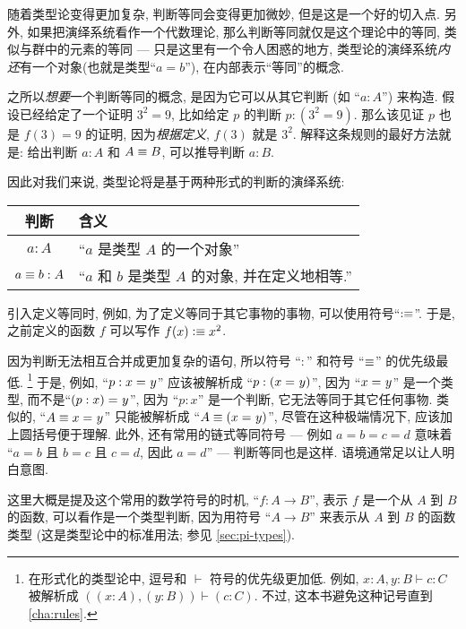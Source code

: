 随着类型论变得更加复杂, 判断等同会变得更加微妙, 但是这是一个好的切入点.
另外, 如果把演绎系统看作一个代数理论, 那么判断等同就仅是这个理论中的等同, 类似与群中的元素的等同 ---
只是这里有一个令人困惑的地方, 类型论的演绎系统\emph{内}\emph{还}有一个对象(也就是类型``$a=b$''), 在内部表示``等同''的概念.

之所以\emph{想要}一个判断等同的概念, 是因为它可以从其它判断 (如 ``$a:A$'') 来构造.
假设已经给定了一个证明 $3^2=9$, 比如给定 $p$ 的判断 $p:(3^2=9)$.
那么该见证 $p$ 也是 $f(3)=9$ 的证明, 因为\emph{根据定义}, $f(3)$ 就是 $3^2$.
解释这条规则的最好方法就是: 给出判断 $a:A$ 和 $A\equiv B$, 可以推导判断 $a:B$.

因此对我们来说, 类型论将是基于两种形式的判断的演绎系统:
\begin{center}
    \medskip
    \begin{tabular}{cl}
        \toprule
        判断              & 含义                                \\
        \midrule
        $a : A$         & ``$a$ 是类型 $A$ 的一个对象''             \\
        $a \equiv b : A$ & ``$a$ 和 $b$ 是类型 $A$ 的对象, 并在定义地相等.'' \\
        \bottomrule
    \end{tabular}
    \medskip
\end{center}%
%
引入定义等同时, 例如, 为了定义等同于其它事物的事物, 可以使用符号``$\vcentcolon\equiv$''.
于是, 之前定义的函数 $f$ 可以写作 $f(x)\vcentcolon\equiv x^2$.

因为判断无法相互合并成更加复杂的语句, 所以符号 ``$:$'' 和符号 ``$\equiv$'' 的优先级最低.
\footnote{在形式化的类型论中, 逗号和 $\vdash$ 符号的优先级更加低.
例如, $x:A,y:B\vdash c:C$ 被解析成 $((x:A),(y:B))\vdash (c:C)$.
不过, 这本书避免这种记号直到 \cref{cha:rules}.}
于是, 例如, ``$p:x =_{} y$'' 应该被解析成 ``$p:(x =_{} y)$'', 因为 ``$x =_{} y$'' 是一个类型, 而不是``$(p:x) =_{} y$'', 因为 ``$p:x$'' 是一个判断, 它无法等同于其它任何事物.
类似的, ``$A\equiv x =_{} y$'' 只能被解析成 ``$A\equiv(x =_{} y)$'', 尽管在这种极端情况下, 应该加上圆括号便于理解.
此外, 还有常用的链式等同符号 --- 例如 $a=b=c=d$ 意味着 ``$a=b$ 且 $b=c$ 且 $c=d$, 因此 $a=d$'' --- 判断等同也是这样.
语境通常足以让人明白意图.

这里大概是提及这个常用的数学符号的时机, ``$f:A\to B$'', 表示 $f$ 是一个从 $A$ 到 $B$ 的函数, 可以看作是一个类型判断, 因为用符号 ``$A\to B$'' 来表示从 $A$ 到 $B$ 的函数类型
(这是类型论中的标准用法;
参见 \cref{sec:pi-types}).

